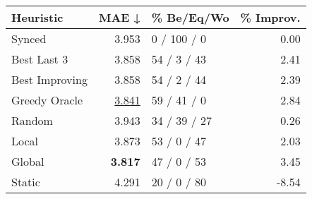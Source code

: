 \begin{tabular}{lrlr}
\toprule
\textbf{Heuristic} & \textbf{MAE ↓} & \textbf{\% Be/Eq/Wo} & \textbf{\% Improv.} \\
\midrule
            Synced &          3.953 &          0 / 100 / 0 &                0.00 \\
\midrule
       Best Last 3 &          3.858 &          54 / 3 / 43 &                2.41 \\
    Best Improving &          3.858 &          54 / 2 / 44 &                2.39 \\
\addlinespace
     Greedy Oracle &          \underline{3.841} &          59 / 41 / 0 &                2.84 \\
            Random &          3.943 &         34 / 39 / 27 &                0.26 \\
\midrule
             Local &          3.873 &          53 / 0 / 47 &                2.03 \\
            Global &          \textbf{3.817} &          47 / 0 / 53 &                3.45 \\
\midrule
            Static &          4.291 &          20 / 0 / 80 &               -8.54 \\
\bottomrule
\end{tabular}

\label{tab:ds_iid_lr01_le2_bs2_Summary}
